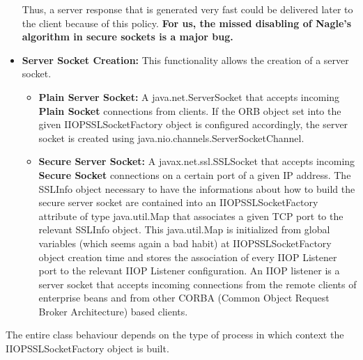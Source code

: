 \begin{itemize}
		Thus, a server response that is generated very fast could be delivered later to the client because of this policy.
		\textbf{For us, the missed disabling of Nagle's algorithm in secure sockets is a major bug.}
	\item \textbf{Server Socket Creation:}
		This functionality allows the creation of a server socket.
		\begin{itemize}
			\item \textbf{Plain Server Socket:}
				A java.net.ServerSocket that accepts incoming \textbf{Plain Socket} connections from clients. If the ORB object set into the given IIOPSSLSocketFactory object is configured accordingly, the server socket is created using java.nio.channels.ServerSocketChannel.
			\item \textbf{Secure Server Socket:}
				A javax.net.ssl.SSLSocket that accepts incoming \textbf{Secure Socket} connections on a certain port of a given IP address.
				The SSLInfo object necessary to have the informations about how to build the secure server socket are contained into an IIOPSSLSocketFactory attribute of type java.util.Map that associates a given TCP port to the relevant SSLInfo object.
				This java.util.Map is initialized from global variables (which seems again a bad habit) at IIOPSSLSocketFactory object creation time and stores the association of every IIOP Listener port to the relevant IIOP Listener configuration.
				An IIOP listener is a server socket that accepts incoming connections from the remote clients of enterprise beans and from other CORBA (Common Object Request Broker Architecture) based clients.
		\end{itemize}
\end{itemize}



The entire class behaviour depends on the type of process in which context the IIOPSSLSocketFactory object is built.











